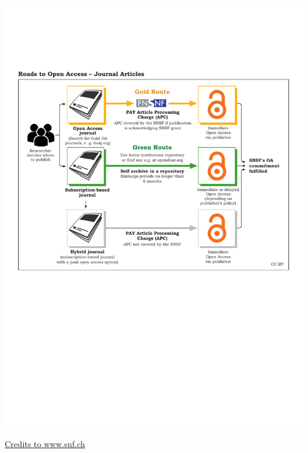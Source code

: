 \documentclass[10pt,compress,serif,aspectratio=169]{beamer}
\begin{document}
\begin{frame}[t]%
 \vskip1cm%

 \begin{center}
\includegraphics[width=.9\textwidth]{SNSF_Roads_to_OA_Articles}
\end{center}
\href{https://www.snf.ch/en/VyUvGzptStOEpUoC/topic/open-access-to-publications}{Credits to www.snf.ch}

\end{frame}

\end{document}
